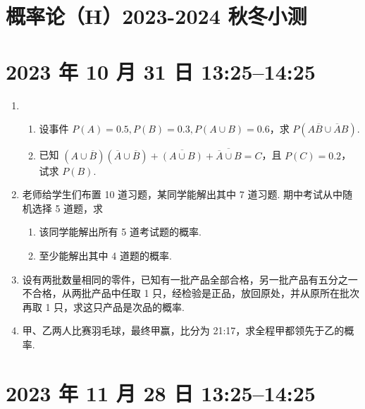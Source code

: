 \documentclass{ctexart}
\begin{document}
\thispagestyle{empty}

\section*{\huge 概率论（H）2023-2024 秋冬小测}

\section*{2023 年 10 月 31 日 13:25--14:25}

\begin{enumerate}
    \item \begin{enumerate}
        \item 设事件 $ P(A) = 0.5, P(B) = 0.3, P(A \cup B) = 0.6 $，求 $ P(A\overline{B} \cup \overline{A}B)$.

        \item 已知 $ (A \cup \overline{B})(\overline{A} \cup \overline{B}) + \overline{(A \cup B)} + \overline{\overline{A} \cup B} = C $，且 $ P(C) = 0.2 $，试求 $ P(B) $.
    \end{enumerate}

    \item 老师给学生们布置 10 道习题，某同学能解出其中 7 道习题. 期中考试从中随机选择 5 道题，求
    \begin{enumerate}
        \item 该同学能解出所有 5 道考试题的概率.
        \item 至少能解出其中 4 道题的概率.
    \end{enumerate}

    \item 设有两批数量相同的零件，已知有一批产品全部合格，另一批产品有五分之一不合格，从两批产品中任取 1 只，经检验是正品，放回原处，并从原所在批次再取 1 只，求这只产品是次品的概率.

    \item 甲、乙两人比赛羽毛球，最终甲赢，比分为 21:17，求全程甲都领先于乙的概率.
\end{enumerate}

\section*{2023 年 11 月 28 日 13:25--14:25}
\end{document}
